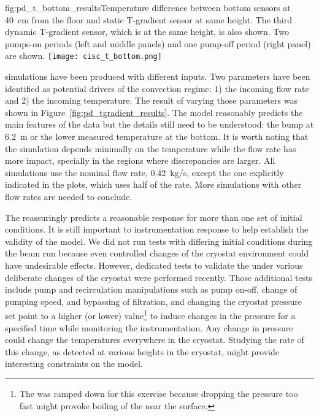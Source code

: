 \begin{dunefigure}{fig:pd_t_bottom_results}{Temperature difference between bottom sensors at 40~cm from the floor and static T-gradient sensor at same height. The third dynamic T-gradient sensor, which is  at the same height, is also shown. Two pumps-on periods (left and middle panels) and one pump-off period (right panel) are shown.}
  \texttt{[image: cisc\_t\_bottom.png]}%
\end{dunefigure}

 simulations have been produced with different inputs. Two parameters have been identified as potential drivers of the convection regime: 1) the incoming  flow rate and 2) the incoming  temperature. The result of varying those parameters was shown in Figure~\ref{fig:pd_tgradient_results}. 
The  model reasonably predicts the main features of the data but the details still need to be understood: the bump at 6.2~m or the lower measured temperature at the bottom. It is worth noting that the simulation depends minimally on the  temperature while the flow rate has more impact, specially in the regions where discrepancies are larger. All simulations use the nominal  flow rate, 0.42~kg/s, except the one explicitly indicated 
in the plots, which uses half of the rate. More simulations with other  flow rates are needed to conclude.  

The  reassuringly predicts a reasonable response for more than one set of initial conditions. It is still important to %
instrumentation response to help establish the validity of the  model. We did not run tests with differing initial conditions during the beam run because even controlled changes of the cryostat environment could have undesirable effects. However, dedicated tests to validate the  under various deliberate changes of the cryostat were performed recently. Those  additional tests include pump and recirculation manipulations such as pump on-off, change of pumping speed, and bypassing of filtration, and changing the cryostat pressure set point to a higher (or lower) value\footnote{The  %
was ramped down for this exercise because dropping the pressure too fast might provoke boiling of the  near the surface.} to induce changes in the pressure for a specified time while monitoring the instrumentation. Any change in pressure could change the temperatures everywhere in the cryostat. Studying the rate of this change, as detected at various heights in the cryostat, might provide interesting constraints on the  model.

